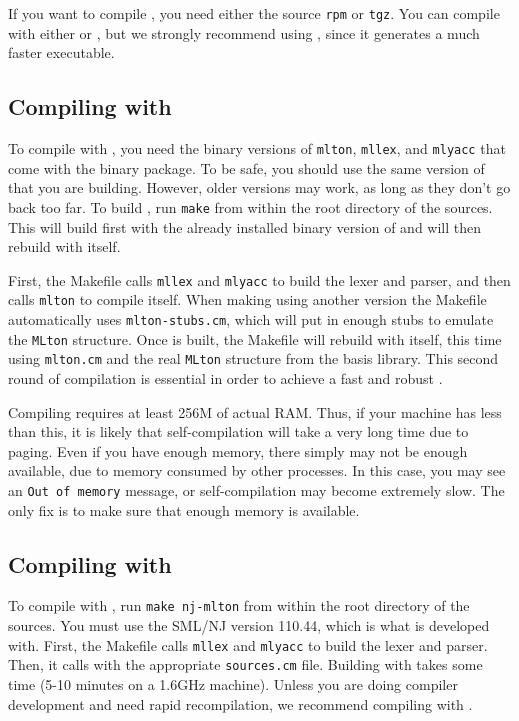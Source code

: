 %
If you want to compile {\mlton}, you need either the source {\tt rpm}
or {\tt tgz}.  You can compile with either {\mlton} or {\smlnj}, but
we strongly recommend using {\mlton}, since it generates a much faster
executable.
%
\subsection{Compiling with {\mlton}}

To compile with {\mlton}, you need the binary versions of {\tt mlton},
{\tt mllex}, and {\tt mlyacc} that come with the {\mlton} binary
package.  To be safe, you should use the same version of {\mlton} that
you are building.  However, older versions may work, as long as they
don't go back too far.  To build {\mlton}, run {\tt make} from within
the root directory of the sources.  This will build {\mlton} first
with the already installed binary version of {\mlton} and will then
rebuild {\mlton} with itself.

First, the Makefile calls {\tt mllex} and {\tt mlyacc} to build the
lexer and parser, and then calls {\tt mlton} to compile itself.  When
making {\mlton} using another version the Makefile automatically uses
{\tt mlton-stubs.cm}, which will put in enough stubs to emulate the
{\tt MLton} structure.  Once {\mlton} is built, the Makefile will
rebuild {\mlton} with itself, this time using {\tt mlton.cm} and the
real {\tt MLton} structure from the basis library.  This second round
of compilation is essential in order to achieve a fast and robust
{\mlton}.

Compiling {\mlton} requires at least 256M of actual RAM.  Thus, if
your machine has less than this, it is likely that self-compilation
will take a very long time due to paging.  Even if you have enough
memory, there simply may not be enough available, due to memory
consumed by other processes.  In this case, you may see an {\tt Out of
memory} message, or self-compilation may become extremely slow.  The
only fix is to make sure that enough memory is available.
%
\subsection{Compiling with {\smlnj}}

To compile with {\smlnj}, run {\tt make nj-mlton} from within the root
directory of the sources.  You must use the SML/NJ version 110.44,
which is what {\mlton} is developed with.  First, the Makefile calls
{\tt mllex} and {\tt mlyacc} to build the lexer and parser.  Then, it
calls {\smlnj} with the appropriate {\tt sources.cm} file.  Building
with {\smlnj} takes some time (5-10 minutes on a 1.6GHz machine).
Unless you are doing compiler development and need rapid
recompilation, we recommend compiling with {\mlton}.
